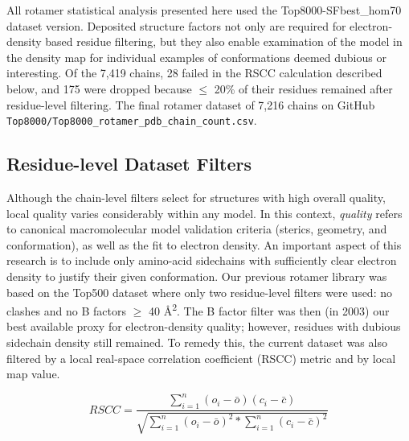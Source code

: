 All rotamer statistical analysis presented here used the Top8000-SFbest\_hom70 dataset version. Deposited structure factors not only are required for electron-density based residue filtering, but they also enable examination of the model in the density map for individual examples of conformations deemed dubious or interesting. Of the 7,419 chains, 28 failed in the RSCC calculation described below, and 175 were dropped because $\le$ 20\% of their residues remained after residue-level filtering. The final rotamer dataset of 7,216 chains on GitHub \texttt{Top8000/Top8000\_rotamer\_pdb\_chain\_count.csv}.


\subsection{Residue-level Dataset Filters}
\label{sec:resfilters}
Although the chain-level filters select for structures with high overall quality, local quality varies considerably within any model. In this context, \emph{quality} refers to canonical macromolecular model validation criteria (sterics, geometry, and conformation), as well as the fit to electron density. An important aspect of this research is to include only amino-acid sidechains with sufficiently clear electron density to justify their given conformation. Our previous rotamer library was based on the Top500 dataset where only two residue-level filters were used: no clashes and no B factors $\ge$ 40 \AA\textsuperscript{2}. The B factor filter was then (in 2003) our best available proxy for electron-density quality; however, residues with dubious sidechain density still remained. To remedy this, the current dataset was also filtered by a local real-space correlation coefficient (RSCC) metric \textcolor{red}{\cite{Kleywegt:ba5061}} and by local map value.

\begin{equation}
RSCC = \frac{\sum_{i=1}^{n} \left ( o_{i} - \bar{o} \right )\left ( c_{i} - \bar{c} \right )}{\sqrt{\sum_{i=1}^{n} \left ( o_{i} - \bar{o} \right )^{2} \ast \sum_{i=1}^{n}\left ( c_{i} - \bar{c} \right )^{2}}}
\label{rscceq}
\end{equation}

